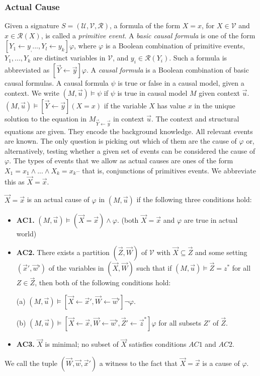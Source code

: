\subsubsection{Actual Cause}
Given a signature $S= (\mathcal{U},\mathcal{V},\mathcal{R})$, a formula of the form $X =x$, for $X \in \mathcal{V}$ and $x \in \mathcal{R}(X)$, is called a \textit{primitive event}.
A \textit{basic causal formula} is one of the form $[Y_1 \leftarrow y_, ..., Y_l\leftarrow y_k]\varphi$, where $\varphi$ is a Boolean combination of primitive events, $Y_1,...,Y_k$ are distinct variables in $\mathcal{V}$, and $y_i \in \mathcal{R}(Y_i)$.
Such a formula is abbreviated as $[\vec{Y}\leftarrow\vec{y}]\varphi$.
A \textit{causal formula} is a Boolean combination of basic causal formulas.
A causal formula $\psi$ is true or false in a causal model, given a context.
We write $(M,\vec u)\models \psi$ if $\psi$ is true in causal model $M$ given context $\vec u$.
$(M,\vec u)\models [\vec Y\leftarrow \vec y](X=x)$ if the variable $X$ has value $x$ in the unique solution to the equation in $M_{\vec{Y} \leftarrow \vec{y}}$ in context $\vec u$.
The context and structural equations are given.
They encode the background knowledge.
All relevant events are known.
The only question is picking out which of them are the cause of $\varphi$ or, alternatively, testing whether a given set of events can be considered the cause of $\varphi$.
The types of events that we allow as actual causes are ones of the form $X_1 = x_1 \wedge ... \wedge X_k=x_k$-- that is, conjunctions of primitives events.
We abbreviate this as $\vec X = \vec x$.
\begin{definition}
    $\vec X = \vec x$ is an actual cause of $\varphi$ in $(M,\vec u)$ if the following three conditions hold:
    \begin{itemize}
        \item  \textbf{AC1.} $(M,\vec u)\models (\vec X = \vec x) \wedge \varphi$.
              (both $\vec X = \vec x$ and $\varphi$ are true in actual world)
        \item  \textbf{AC2. }There exists a partition $(\vec Z, \vec W)$ of $\mathcal{V}$ with $\vec X \subseteq \vec Z$ and some setting $(\vec x',\vec w')$ of the variables in $(\vec X,\vec W)$ such that if $(M,\vec u)\models \vec Z = z^*$ for all $Z\in \vec Z$, then both of the following conditions hold:

              (a) $(M,\vec u)\models[\vec X \leftarrow \vec x', \vec W \leftarrow \vec w']\neg \varphi$.

              (b) $(M,\vec u)\models[\vec X\leftarrow \vec x, \vec W \leftarrow \vec w', \vec Z'\leftarrow \vec z^*]\varphi$ for all subsets $Z'$ of $\vec Z$.

        \item  \textbf{AC3.} $\vec X$ is minimal; no subset of $\vec X$ satisfies conditions $AC1$ and $AC2$.
    \end{itemize}
\end{definition}
We call the tuple $(\vec W, \vec w,\vec x')$ a witness to the fact that $\vec X=\vec x$ is a cause of $\varphi$.

